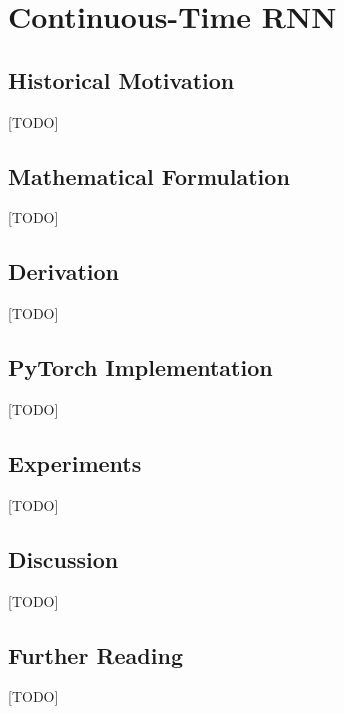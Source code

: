 
\chapter{Continuous-Time RNN}
\label{ch:04_continuous_time_rnn}


\section{Historical Motivation}
[TODO]

\section{Mathematical Formulation}
[TODO]

\section{Derivation}
[TODO]

\section{PyTorch Implementation}
[TODO]

\section{Experiments}
[TODO]

\section{Discussion}
[TODO]

\section{Further Reading}
[TODO]
